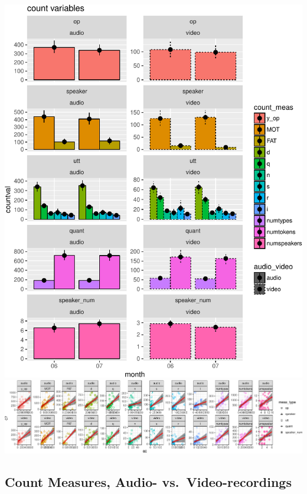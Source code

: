 \documentclass[man]{apa6}
\theoremstyle{definition}
\theoremstyle{definition}
\theoremstyle{definition}
\theoremstyle{remark}
\begin{document}
\includegraphics{sixseven_papaja_files/figure-latex/gr_derived_counts_67_diff-1.pdf}
\includegraphics{sixseven_papaja_files/figure-latex/gr_derived_counts_67_corr-1.pdf}

\subsection{Count Measures, Audio-
vs.~Video-recordings}\label{count-measures-audio--vs.video-recordings}
\end{document}
